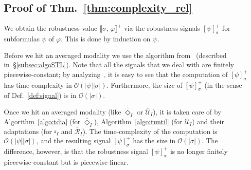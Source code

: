 \documentclass[envcountsect,orivec]{llncs} \usepackage{etex} \usepackage[]{graphicx}
\newcommand{\TUntil}[1]{\mathbin{\overline{\mathcal{U}}_{#1}}}
\newcommand{\TRelease}[1]{\mathbin{\overline{\mathcal{R}}_{#1}}}
\newcommand{\TDiaOp}[1]{\overline{\Diamond}_{#1}}
\newcommand{\TBoxOp}[1]{\overline{\square}_{#1}}
\newcommand{\Robust}[2]{{ \llbracket #1,\, #2 \rrbracket}}
\begin{document}
\subsection{Proof of Thm.~\ref{thm:complexity_rel}}
\begin{myproof} 
 We obtain the robustness value
 $\Robust{\sigma}{\varphi}^{+}$
 via the robustness signals $[\psi]^{+}_{\sigma}$ for subformulas $\psi$
 of $\varphi$. This is done by induction on $\psi$.
 
 Before we hit an averaged modality we use the algorithm from~\cite{DBLP:conf/cav/DonzeFM13} (described
 in~\S{}\ref{subsec:algoSTL}).
 Note that all the signals that we deal with are
 finitely piecewise-constant; by
 analyzing~\cite[Thm.~3]{DBLP:conf/cav/DonzeFM13},
 it is easy to see that the computation of
$[\psi]^{+}_{\sigma}$ has time-complexity in
 $\mathcal{O}(|\psi| |\sigma|)$. Furthermore, the size of 
 $[\psi]^{+}_{\sigma}$ (in the sense of Def.~\ref{def:signal}) is 
 in $\mathcal{O}(|\sigma|)$.


 Once we hit an averaged modality (like $\TDiaOp{I}$ or $\TUntil{I}$),
 it is
 taken care of by  Algorithm~\ref{algo:tdia} (for $\TDiaOp{I}$), 
 Algorithm~\ref{algo:tuntil} (for $\TUntil{I}$) and their adaptations
 (for $\TBoxOp{I}$ and $\TRelease{I}$). The time-complexity of the computation is
  $\mathcal{O}(|\psi| |\sigma|)$, and the resulting 
 signal $[\psi]^{+}_{\sigma}$ has the size 
 in $\mathcal{O}(|\sigma|)$.
The difference, however, is that the robustness signal
 $[\psi]^{+}_{\sigma}$ is no longer finitely piecewise-constant but is
 piecewise-linear.


\end{myproof}
\end{document}
